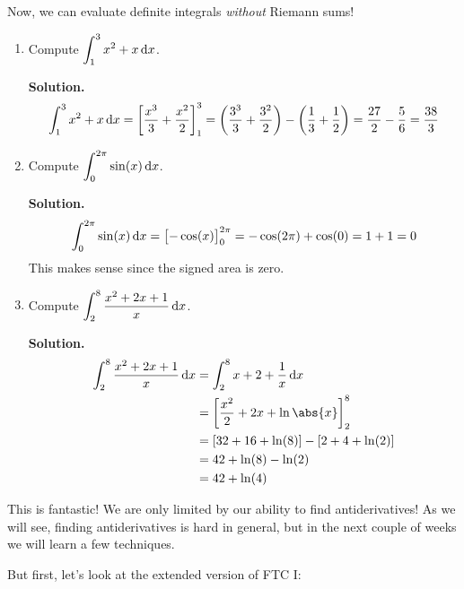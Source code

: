 Now, we can evaluate definite integrals \emph{without} Riemann sums!

\begin{Example}{}{}
    \begin{enumerate}[label=(\roman*)]
        \item Compute $ \displaystyle \int_{1}^{3} x^2+x\odif{x} $.

              \textbf{Solution.}
              \[
                  \int_{1}^{3} x^2+x\odif{x}
                  =\left[\frac{x^3}{3}+\frac{x^2}{2}\right]_{1}^3
                  = \left( \frac{3^3}{3} +\frac{3^2}{2} \right)-\left( \frac{1}{3}+\frac{1}{2} \right)
                  =\frac{27}{2} -\frac{5}{6}
                  =\frac{38}{3}
              \]
        \item Compute $ \displaystyle  \int_{0}^{2\pi} \sin(x)\odif{x} $.

              \textbf{Solution.}
              \[
                  \int_{0}^{2\pi} \sin(x)\odif{x}
                  =\bigl[-\cos(x)\bigr]_0^{2\pi}
                  =-\cos(2\pi)+\cos(0)
                  =1+1
                  =0
              \]
              This makes sense since the signed area is zero.
        \item Compute $
                  \displaystyle \int_{2}^{8} \frac{x^2+2x+1}{x} \odif{x} $.

              \textbf{Solution.}
              \begin{align*}
                  \int_{2}^{8} \frac{x^2+2x+1}{x} \odif{x}
                   & =\int_{2}^{8} x+2+\frac{1}{x}\odif{x}             \\
                   & =\left[\frac{x^2}{2} +2x+\ln\abs{x} \right]_{2}^8 \\
                   & =[32+16+\ln(8)]-[2+4+\ln(2)]                      \\
                   & =42+\ln(8)-\ln(2)                                 \\
                   & =42+\ln(4)
              \end{align*}
    \end{enumerate}
\end{Example}

This is fantastic! We are only limited by our ability to find antiderivatives!
As we will see, finding antiderivatives is hard in general, but in the next couple of
weeks we will learn a few techniques.

But first, let's look at the extended version of FTC I\@:


